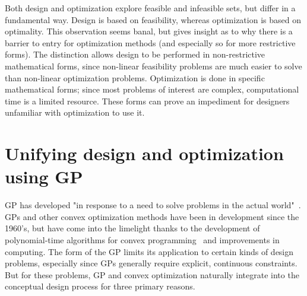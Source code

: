 Both design and
optimization explore feasible and infeasible sets, but differ in a fundamental way.
Design is based on feasibility, whereas optimization is based on optimality.
This observation seems banal, but gives insight as to why there is a barrier
to entry for optimization methods (and especially so for more restrictive forms).
The distinction allows design to be performed
in non-restrictive mathematical forms, since non-linear feasibility problems are
much easier to solve than non-linear optimization problems. Optimization is
done in specific mathematical forms; since most problems of interest are complex,
computational time is a limited resource. These forms can prove
an impediment for designers unfamiliar with optimization to use it.

\section{Unifying design and optimization using GP}

\gls{GP} has developed "in response to a need to solve problems in the actual
world"~\cite{duffingp}. \gls{GP}s and other convex optimization methods have been
in development since the 1960's, but have come into the limelight thanks to the development of
polynomial-time algorithms for convex programming~\cite{interior_point} and
improvements in computing. The form of the \gls{GP} limits its application
to certain kinds of design
problems, especially since \gls{GP}s generally require explicit, continuous constraints.
But for these problems, \gls{GP} and convex
optimization naturally integrate into the conceptual design process
for three primary reasons.

